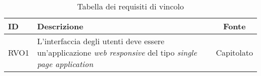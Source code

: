 \begin{table}[H]
	\renewcommand{\arraystretch}{1.5}
	\centering
	\begin{tabularx}{\textwidth}{l|X|c}
		\textbf{ID} & \textbf{Descrizione}                                                                                   & \textbf{Fonte} \\
		\hline
		RVO1        & L'interfaccia degli utenti deve essere un'applicazione \textit{web responsive} del tipo \textit{single page application} & Capitolato     \\
		\hline
	\end{tabularx}
	\caption{Tabella dei requisiti di vincolo}
\end{table}
